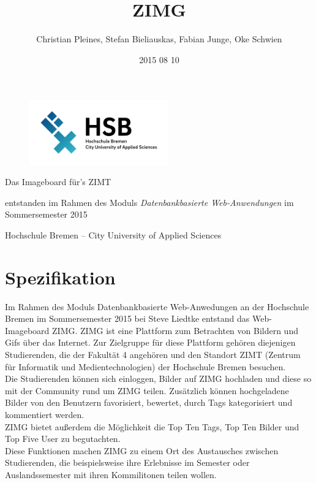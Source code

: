 \documentclass[12pt, oneside, a4paper]{article}		%
\title{ZIMG}
\author{Christian Pleines, Stefan Bieliauskas, Fabian Junge, Oke Schwien}
\date{2015 08 10}
\makeatletter
\renewcommand{\maketitle}{\bgroup\setlength{\parindent}{0pt}
	\begin{center}
		\vspace{4cm}
  		\seqsplit{\Huge{\textbf{\inserttitle}}}

  		\vspace{0.4cm}
  		\Large{Das Imageboard für's ZIMT}

  		\vspace{2cm}
  		\small{entstanden im Rahmen des Moduls \textit{Datenbankbasierte Web-Anwendungen} im Sommersemester 2015}

  		\vspace{2cm}
  		\large{\insertauthor}

  		\vspace{8cm}
  		\small{\insertdate}

  		\small{Hochschule Bremen -- City University of Applied Sciences}

	\end{center}\egroup
}
\let\inserttitle\@title
\let\insertauthor\@author
\let\insertdate\@date
\makeatother
\begin{document}
\begin{figure}[H]
	\centering
 	\includegraphics[width=6cm]{footage/Hochschule_Bremen_Logo_RGB} 
	\label{logoofhochschulebremengermany}
\end{figure}

\maketitle												%
\thispagestyle{empty}									%

\newpage

\tableofcontents

\newpage

\section{Spezifikation}

Im Rahmen des Moduls Datenbankbasierte Web-Anwedungen an der Hochschule Bremen im Sommersemester 2015 bei Steve Liedtke entstand das Web-Imageboard ZIMG. ZIMG ist eine Plattform zum Betrachten von Bildern und Gifs über das Internet. Zur Zielgruppe für diese Plattform gehören diejenigen Studierenden, die der Fakultät 4 angehören und den Standort ZIMT (Zentrum für Informatik und Medientechnologien) der Hochschule Bremen besuchen. \\
Die Studierenden können sich einloggen, Bilder auf ZIMG hochladen und diese so mit der Community rund um ZIMG teilen. Zusätzlich können hochgeladene Bilder von den Benutzern favorisiert, bewertet, durch Tags kategorisiert und kommentiert werden. \\
ZIMG bietet außerdem die Möglichkeit die Top Ten Tags, Top Ten Bilder und Top Five User zu begutachten. \\
Diese Funktionen machen ZIMG zu einem Ort des Austausches zwischen Studierenden, die beispielsweise ihre Erlebnisse im Semester oder Auslandssemester mit ihren Kommilitonen teilen wollen.
\end{document}
